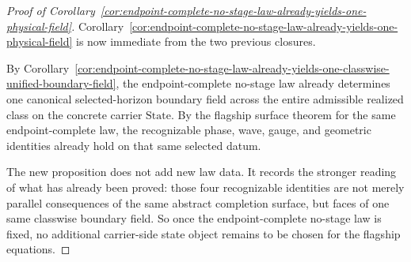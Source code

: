 \begin{proof}[Proof of Corollary~\ref{cor:endpoint-complete-no-stage-law-already-yields-one-physical-field}]
\label{proof:cor:endpoint-complete-no-stage-law-already-yields-one-physical-field}
Corollary~\ref{cor:endpoint-complete-no-stage-law-already-yields-one-physical-field}
is now immediate from the two previous closures.

By Corollary~\ref{cor:endpoint-complete-no-stage-law-already-yields-one-classwise-unified-boundary-field},
the endpoint-complete no-stage law already determines one canonical
selected-horizon boundary field across the entire admissible realized class on
the concrete carrier \(\mathrm{State}\). By the flagship surface theorem for
the same endpoint-complete law, the recognizable phase, wave, gauge, and
geometric identities already hold on that same selected datum.

The new proposition  does not add new
law data. It records the stronger reading of what has already been proved:
those four recognizable identities are not merely parallel consequences of the
same abstract completion surface, but faces of one same classwise boundary
field. So once the endpoint-complete no-stage law is fixed, no additional
carrier-side state object remains to be chosen for the flagship equations.
\end{proof}

